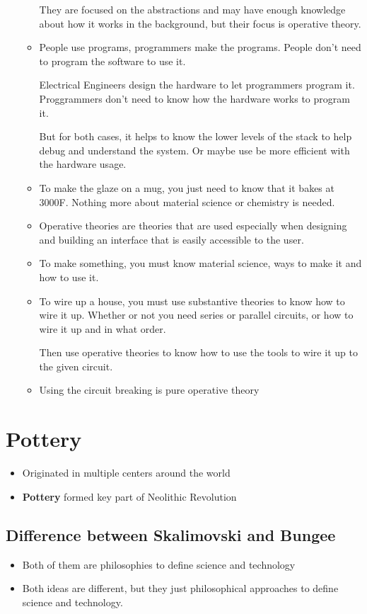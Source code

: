 \documentclass{article}
\begin{document}
\begin{enumerate}
\begin{itemize}
        They are focused on the abstractions and may have enough knowledge
        about how it works in the background, but their focus is operative theory.
      \item People use programs, programmers make the programs. People
        don't need to program the software to use it.

        Electrical Engineers design the hardware to let programmers
        program it. Proggrammers don't need to know
        how the hardware works to program it.

        But for both cases, it helps to know the lower levels of the stack
        to help debug and understand the system. Or maybe use
        be more efficient with the hardware usage.
      \item To make the glaze on a mug, you just need to know
        that it bakes at 3000F. Nothing more about
        material science or chemistry is needed.
      \item Operative theories are theories that are used
        especially when designing and building an interface
        that is easily accessible to the user.
      \item To make something, you must know material science,
        ways to make it and how to use it.
      \item To wire up a house, you must use substantive theories
        to know how to wire it up. Whether or not you need series or
        parallel circuits, or how to wire it up and in what order.

        Then use operative theories
        to know how to use the tools to wire it up to the given circuit.
      \item Using the circuit breaking is pure operative theory
    \end{itemize}
\end{enumerate}

\section*{Pottery}
\begin{itemize}
  \item Originated in multiple centers around the world
  \item \textbf{Pottery} formed key part of Neolithic Revolution
\end{itemize}

\subsection{Difference between Skalimovski and Bungee}
\begin{itemize}
  \item Both of them are philosophies to define science and technology
  \item Both ideas are different, but they just philosophical approaches
    to define science and technology.
\end{itemize}
\end{document}
